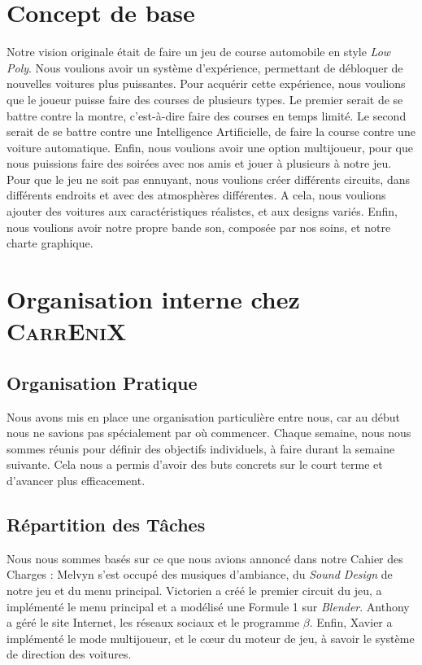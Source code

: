 \documentclass[a4paper,12pt]{article}
\newcommand{\AI}{Intelligence Artificielle}
\newcommand{\CEX}{\textsc{CarrEniX}}
\begin{document}
    \clearpage
    \section{Concept de base}
        Notre vision originale était de faire un jeu de course automobile en style \textit{Low Poly}.
        Nous voulions avoir un système d'expérience, permettant de débloquer de nouvelles voitures plus puissantes.
        Pour acquérir cette expérience, nous voulions que le joueur puisse faire des courses de plusieurs types.
        Le premier serait de se battre contre la montre, c'est-à-dire faire des courses en temps limité.
        Le second serait de se battre contre une \AI, de faire la course contre une voiture automatique.
        Enfin, nous voulions avoir une option multijoueur, pour que nous puissions faire des soirées avec nos amis
        et jouer à plusieurs à notre jeu. Pour que le jeu ne soit pas ennuyant, nous voulions créer différents
        circuits, dans différents endroits et avec des atmosphères différentes. A cela, nous voulions ajouter des voitures aux caractéristiques réalistes, et aux designs variés. Enfin, 
        nous voulions avoir notre propre bande son, composée par nos soins, et notre charte graphique.
    
    \clearpage
    
    \section{Organisation interne chez \CEX}
    \subsection{Organisation Pratique}
        Nous avons mis en place une organisation particulière entre nous,
        car au début nous ne savions pas spécialement par où commencer.
        Chaque semaine, nous nous sommes réunis pour définir des 
        objectifs individuels, à faire durant la semaine suivante. Cela nous 
        a permis d’avoir des buts concrets sur le court terme et d'avancer plus 
        efficacement.

    \subsection{Répartition des Tâches}
        Nous nous sommes basés sur ce que nous avions annoncé dans notre Cahier des Charges :
        Melvyn s'est occupé des musiques d'ambiance, du \textit{Sound Design} de 
        notre jeu et du menu principal. Victorien a créé le premier circuit du jeu,
        a implémenté le menu principal et a modélisé une Formule 1 sur \textsl{Blender}.
        Anthony a géré le site Internet, les réseaux sociaux et le programme \(\beta\).
        Enfin, Xavier a implémenté le mode multijoueur, et le cœur du moteur de jeu,
        à savoir le système de direction des voitures.
        
\end{document}
